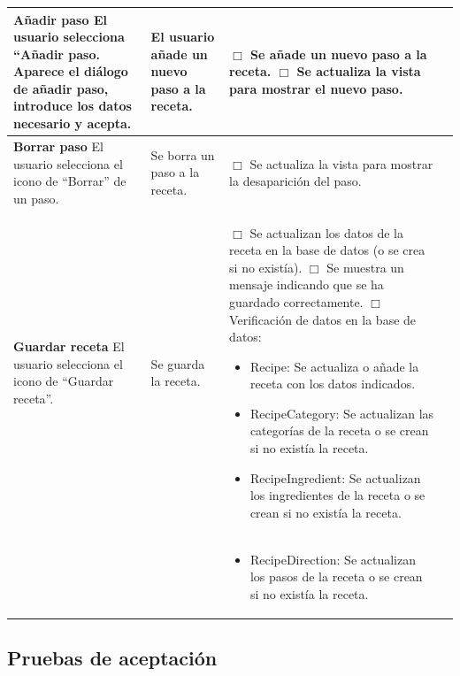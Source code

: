 \begin{center}
\begin{longtable}{|p{3.75cm}|p{3.5cm}|p{5.25cm}|p{1.5cm}|}
    \textbf{Añadir paso}\newline
    El usuario selecciona ``Añadir paso. Aparece el diálogo de añadir
    paso, introduce los datos necesario y acepta. &
    El usuario añade un nuevo paso a la receta. &
    $\Box$ Se añade un nuevo paso a la receta.\newline
    $\Box$ Se actualiza la vista para mostrar el nuevo paso.
    & \\ \hline

    \textbf{Borrar paso}\newline
    El usuario selecciona el icono de ``Borrar'' de un paso. &
    Se borra un paso a la receta. &
    $\Box$ Se actualiza la vista para mostrar la desaparición del paso.
    & \\ \hline
    
    \textbf{Guardar receta}\newline
    El usuario selecciona el icono de ``Guardar receta''. &
    Se guarda la receta. &
    $\Box$ Se actualizan los datos de la receta en la base de datos (o se
    crea si no existía).\newline
    $\Box$ Se muestra un mensaje indicando que se ha guardado
    correctamente.\newline
    $\Box$ Verificación de datos en la base de datos:
    \begin{itemize}
    \item Recipe: Se actualiza o añade la receta con los datos indicados.
    \item RecipeCategory: Se actualizan las categorías de la receta o se crean
      si no existía la receta.
    \item RecipeIngredient: Se actualizan los ingredientes de la receta o se
      crean si no existía la receta.
    \end{itemize}
    & \\ \hline
    
    & & 
    \begin{itemize}
    \item RecipeDirection: Se actualizan los pasos de la receta o se crean
      si no existía la receta.
    \end{itemize}    
    & \\ \hline
  \end{longtable}
\end{center}

    
\subsection{Pruebas de aceptación}

